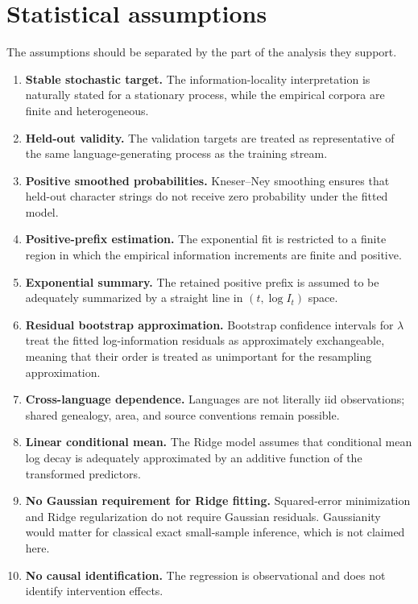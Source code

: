 \documentclass[11pt]{article}
\begin{document}
\section{Statistical assumptions}
The assumptions should be separated by the part of the analysis they support.

\begin{enumerate}
\item \textbf{Stable stochastic target.} The information-locality interpretation is naturally stated for a stationary process, while the empirical corpora are finite and heterogeneous.
\item \textbf{Held-out validity.} The validation targets are treated as representative of the same language-generating process as the training stream.
\item \textbf{Positive smoothed probabilities.} Kneser--Ney smoothing ensures that held-out character strings do not receive zero probability under the fitted model.
\item \textbf{Positive-prefix estimation.} The exponential fit is restricted to a finite region in which the empirical information increments are finite and positive.
\item \textbf{Exponential summary.} The retained positive prefix is assumed to be adequately summarized by a straight line in $(t,\log I_t)$ space.
\item \textbf{Residual bootstrap approximation.} Bootstrap confidence intervals for $\lambda$ treat the fitted log-information residuals as approximately exchangeable, meaning that their order is treated as unimportant for the resampling approximation.
\item \textbf{Cross-language dependence.} Languages are not literally iid observations; shared genealogy, area, and source conventions remain possible.
\item \textbf{Linear conditional mean.} The Ridge model assumes that conditional mean log decay is adequately approximated by an additive function of the transformed predictors.
\item \textbf{No Gaussian requirement for Ridge fitting.} Squared-error minimization and Ridge regularization do not require Gaussian residuals. Gaussianity would matter for classical exact small-sample inference, which is not claimed here.
\item \textbf{No causal identification.} The regression is observational and does not identify intervention effects.
\end{enumerate}
\end{document}
